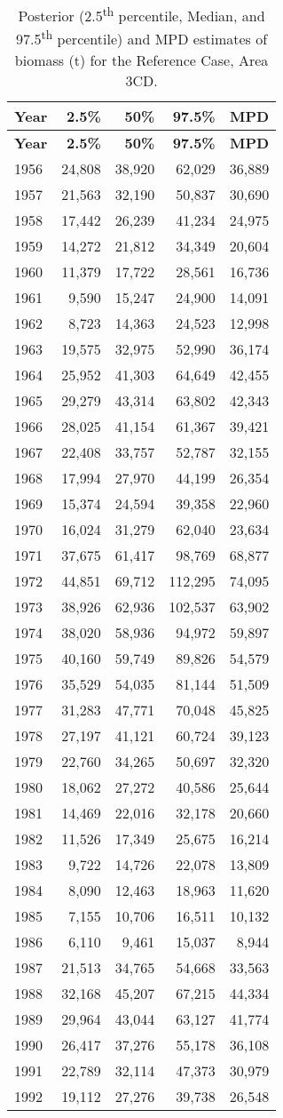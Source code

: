 \documentclass[11pt]{book}
\begin{document}
\begin{longtable}[]{@{}lrrrr@{}}
\caption{\label{tab:tab-post-biomass-3cd}Posterior (2.5\textsuperscript{th} percentile, Median, and 97.5\textsuperscript{th} percentile) and MPD estimates of biomass (t) for the Reference Case, Area 3CD.}\tabularnewline
\toprule
\textbf{Year} & \textbf{2.5\%} & \textbf{50\%} & \textbf{97.5\%} & \textbf{MPD}\tabularnewline
\midrule
\endfirsthead
\toprule
\textbf{Year} & \textbf{2.5\%} & \textbf{50\%} & \textbf{97.5\%} & \textbf{MPD}\tabularnewline
\midrule
\endhead
1956 & 24,808 & 38,920 & 62,029 & 36,889\tabularnewline
1957 & 21,563 & 32,190 & 50,837 & 30,690\tabularnewline
1958 & 17,442 & 26,239 & 41,234 & 24,975\tabularnewline
1959 & 14,272 & 21,812 & 34,349 & 20,604\tabularnewline
1960 & 11,379 & 17,722 & 28,561 & 16,736\tabularnewline
1961 & 9,590 & 15,247 & 24,900 & 14,091\tabularnewline
1962 & 8,723 & 14,363 & 24,523 & 12,998\tabularnewline
1963 & 19,575 & 32,975 & 52,990 & 36,174\tabularnewline
1964 & 25,952 & 41,303 & 64,649 & 42,455\tabularnewline
1965 & 29,279 & 43,314 & 63,802 & 42,343\tabularnewline
1966 & 28,025 & 41,154 & 61,367 & 39,421\tabularnewline
1967 & 22,408 & 33,757 & 52,787 & 32,155\tabularnewline
1968 & 17,994 & 27,970 & 44,199 & 26,354\tabularnewline
1969 & 15,374 & 24,594 & 39,358 & 22,960\tabularnewline
1970 & 16,024 & 31,279 & 62,040 & 23,634\tabularnewline
1971 & 37,675 & 61,417 & 98,769 & 68,877\tabularnewline
1972 & 44,851 & 69,712 & 112,295 & 74,095\tabularnewline
1973 & 38,926 & 62,936 & 102,537 & 63,902\tabularnewline
1974 & 38,020 & 58,936 & 94,972 & 59,897\tabularnewline
1975 & 40,160 & 59,749 & 89,826 & 54,579\tabularnewline
1976 & 35,529 & 54,035 & 81,144 & 51,509\tabularnewline
1977 & 31,283 & 47,771 & 70,048 & 45,825\tabularnewline
1978 & 27,197 & 41,121 & 60,724 & 39,123\tabularnewline
1979 & 22,760 & 34,265 & 50,697 & 32,320\tabularnewline
1980 & 18,062 & 27,272 & 40,586 & 25,644\tabularnewline
1981 & 14,469 & 22,016 & 32,178 & 20,660\tabularnewline
1982 & 11,526 & 17,349 & 25,675 & 16,214\tabularnewline
1983 & 9,722 & 14,726 & 22,078 & 13,809\tabularnewline
1984 & 8,090 & 12,463 & 18,963 & 11,620\tabularnewline
1985 & 7,155 & 10,706 & 16,511 & 10,132\tabularnewline
1986 & 6,110 & 9,461 & 15,037 & 8,944\tabularnewline
1987 & 21,513 & 34,765 & 54,668 & 33,563\tabularnewline
1988 & 32,168 & 45,207 & 67,215 & 44,334\tabularnewline
1989 & 29,964 & 43,044 & 63,127 & 41,774\tabularnewline
1990 & 26,417 & 37,276 & 55,178 & 36,108\tabularnewline
1991 & 22,789 & 32,114 & 47,373 & 30,979\tabularnewline
1992 & 19,112 & 27,276 & 39,738 & 26,548\tabularnewline

\end{longtable}
\end{document}
